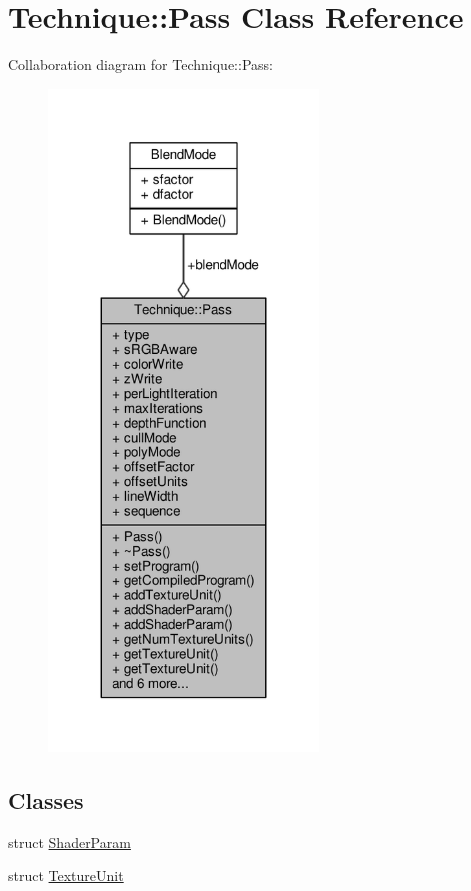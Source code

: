 \hypertarget{classTechnique_1_1Pass}{}\section{Technique\+:\+:Pass Class Reference}
\label{classTechnique_1_1Pass}


Collaboration diagram for Technique\+:\+:Pass\+:
\nopagebreak
\begin{figure}[H]
\begin{center}
\leavevmode
\includegraphics[width=203pt]{df/d90/classTechnique_1_1Pass__coll__graph}
\end{center}
\end{figure}
\subsection*{Classes}
\begin{DoxyCompactItemize}
\item 
struct \hyperlink{structTechnique_1_1Pass_1_1ShaderParam}{Shader\+Param}
\item 
struct \hyperlink{structTechnique_1_1Pass_1_1TextureUnit}{Texture\+Unit}
\end{DoxyCompactItemize}
